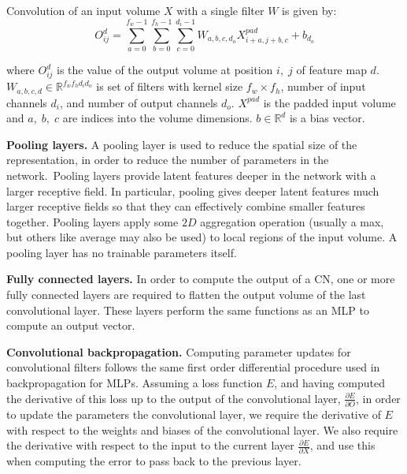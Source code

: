\noindent Convolution of an input volume $ X $ with a single filter $ W $ is given by: 
\begin{equation}
	O_{ij}^{d} = \sum_{a=0}^{f_w - 1}\sum_{b=0}^{f_h - 1}\sum_{c=0}^{d_i - 1}W_{a,b,c,d_o}X_{i+a,j+b,c}^{pad}  + b_{d_o} 
\end{equation}

\noindent where $ O_{ij}^d $ is the value of the output volume at position $ i, \; j $ of feature map $ d $. $ W_{a,b,c,d} \in \mathbb{R}^{f_wf_hd_id_o} $ is set of filters with kernel size $ f_w \times f_h $, number of input channels $ d_i $, and number of output channels $ d_o $. $ X^{pad} $ is the padded input volume and $ a, \; b, \; c $ are indices into the volume dimensions. $ b \in \mathbb{R}^{d} $ is a bias vector. \par

\noindent \textbf{Pooling layers.} A pooling layer is used to reduce the spatial size of the representation, in order to reduce the number of parameters in the network.\ Pooling layers provide latent features deeper in the network with a larger receptive field. In particular, pooling gives deeper latent features much larger receptive fields so that they can effectively combine smaller features together. Pooling layers apply some $ 2D $ aggregation operation (usually a max, but others like average may also be used) to local regions of the input volume. A pooling layer has no trainable parameters itself. \par

\noindent \textbf{Fully connected layers.} In order to compute the output of a CN, one or more fully connected layers are required to flatten the output volume of the last convolutional layer. These layers perform the same functions as an MLP to compute an output vector. \par

\noindent \textbf{Convolutional backpropagation.} Computing parameter updates for convolutional filters follows the same first order differential procedure used in backpropagation for MLPs. Assuming a loss function $ E $, and having computed the derivative of this loss up to the output of the convolutional layer, $ \frac{\partial E} {\partial O} $, in order to update the parameters the convolutional layer, we require the derivative of $ E $ with respect to the weights and biases of the convolutional layer. We also require the derivative with respect to the input to the current layer $\frac{\partial E} {\partial X}$, and use this when computing the error to pass back to the previous layer. \par

